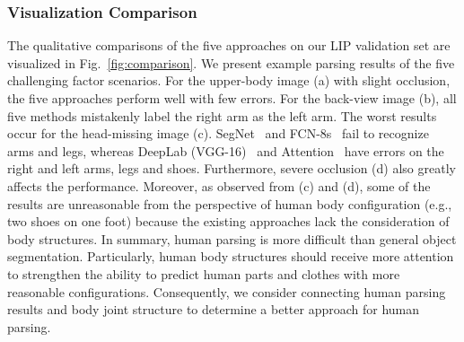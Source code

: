 \documentclass[10pt,journal,compsoc]{IEEEtran}
\begin{document}
\subsubsection{Visualization Comparison}
The qualitative comparisons of the five approaches on our LIP validation set are visualized in Fig.~\ref{fig:comparison}. We present example parsing results of the five challenging factor scenarios. For the upper-body image (a) with slight occlusion, the five approaches perform well with few errors. For the back-view image (b), all five methods mistakenly label the right arm as the left arm. The worst results occur for the head-missing image (c). SegNet~\cite{badrinarayanan2015segnet} and FCN-8s~\cite{long2014fully} fail to recognize arms and legs, whereas DeepLab (VGG-16)~\cite{chen2016deeplab} and Attention~\cite{chen2015attention} have errors on the right and left arms, legs and shoes. Furthermore, severe occlusion (d) also greatly affects the performance. Moreover, as observed from (c) and (d), some of the results are unreasonable from the perspective of human body configuration (e.g., two shoes on one foot) because the existing approaches lack the consideration of body structures. In summary, human parsing is more difficult than general object segmentation. Particularly, human body structures should receive more attention to strengthen the ability to predict human parts and clothes with more reasonable configurations. Consequently, we consider connecting human parsing results and body joint structure to determine a better approach for human parsing.
\end{document}
